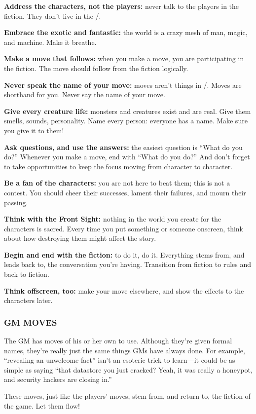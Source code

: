 \documentclass[oneside,10pt]{article}
\begin{document}
\begin{multicols}{2}
\textbf{Address the characters, not the players:} never talk to the
players in the fiction. They don’t live in the
\SW/.

\textbf{Embrace the exotic and fantastic:} the world is a crazy
mesh of man, magic, and machine. Make it breathe.

\textbf{Make a move that follows:} when you make a move, you
are participating in the fiction. The move should follow from
the fiction logically.

\textbf{Never speak the name of your move:} moves aren’t things
in \SW/. Moves are shorthand for you. Never say the
name of your move.

\textbf{Give every creature life:} monsters and creatures exist and
are real. Give them smells, sounds, personality.
Name every person: everyone has a name. Make sure you
give it to them!

\textbf{Ask questions, and use the answers:} the easiest question
is ``What do you do?'' Whenever you make a move, end
with ``What do you do?'' And don’t forget to take opportunities to keep the focus moving from character to
character.

\textbf{Be a fan of the characters:} you are not here to beat them;
this is not a contest. You should cheer their successes,
lament their failures, and mourn their passing.

\textbf{Think with the Front Sight:} nothing in the world you create
for the characters is sacred. Every time you put something
or someone onscreen, think about how destroying them
might affect the story.

\textbf{Begin and end with the fiction:} to do it, do it. Everything
stems from, and leads back to, the conversation you’re having. Transition from fiction to rules and back to
fiction.

\textbf{Think offscreen, too:} make your move elsewhere, and
show the effects to the characters later.

\subsubsection{GM MOVES}
The GM has moves of his or her own to use. Although they’re
given formal names, they’re really just the same things GMs
have always done. For example, ``revealing an unwelcome
fact'' isn’t an esoteric trick to learn—it could be as simple as
saying ``that datastore you just cracked? Yeah, it was really a
honeypot, and security hackers are closing in.''

These moves, just like the players’ moves, stem from, and
return to, the fiction of the game. Let them flow!


\end{multicols}
\end{document}

